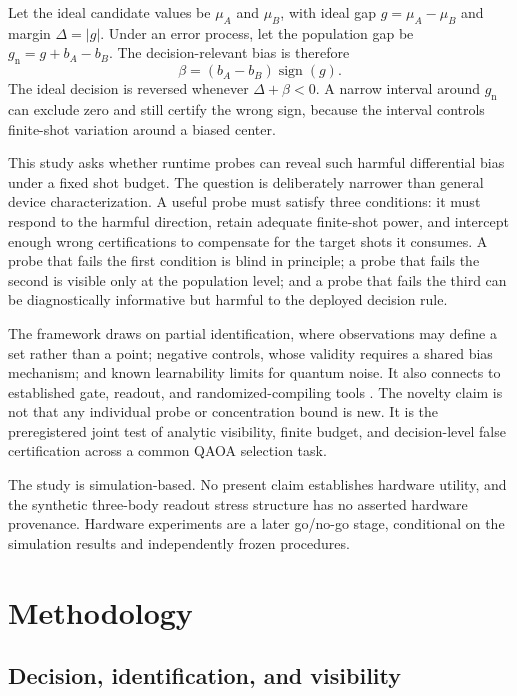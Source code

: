 \documentclass[10pt,twocolumn]{article}
\begin{document}
Let the ideal candidate values be $\mu_A$ and $\mu_B$, with ideal gap
$g=\mu_A-\mu_B$ and margin $\Delta=|g|$. Under an error process, let the
population gap be $g_{\mathrm n}=g+b_A-b_B$. The decision-relevant bias is
therefore
\begin{equation}
  \beta=(b_A-b_B)\operatorname{sign}(g).
  \label{eq:beta}
\end{equation}
The ideal decision is reversed whenever $\Delta+\beta<0$. A narrow interval
around $g_{\mathrm n}$ can exclude zero and still certify the wrong sign,
because the interval controls finite-shot variation around a biased center.

This study asks whether runtime probes can reveal such harmful differential
bias under a fixed shot budget. The question is deliberately narrower than
general device characterization. A useful probe must satisfy three conditions:
it must respond to the harmful direction, retain adequate finite-shot power,
and intercept enough wrong certifications to compensate for the target shots
it consumes. A probe that fails the first condition is blind in principle; a
probe that fails the second is visible only at the population level; and a
probe that fails the third can be diagnostically informative but harmful to
the deployed decision rule.

The framework draws on partial identification, where observations may define a
set rather than a point\cite{imbens2004}; negative controls, whose validity
requires a shared bias mechanism\cite{lipsitch2010}; and known learnability
limits for quantum noise\cite{chen2023learnability}. It also connects to
established gate, readout, and randomized-compiling tools
\cite{bravyi2021,maciejewski2021,wallman2016,czarnik2021}. The novelty claim is
not that any individual probe or concentration bound is new. It is the
preregistered joint test of analytic visibility, finite budget, and
decision-level false certification across a common QAOA selection task.

The study is simulation-based. No present claim establishes hardware utility,
and the synthetic three-body readout stress structure has no asserted hardware
provenance. Hardware experiments are a later go/no-go stage, conditional on
the simulation results and independently frozen procedures.

\section{Methodology}

\subsection{Decision, identification, and visibility}
\end{document}

